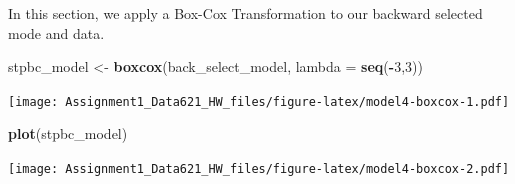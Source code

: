 \documentclass[
]{article}
\newenvironment{Shaded}{\begin{snugshade}}{\end{snugshade}}
\newcommand{\AttributeTok}[1]{\textcolor[rgb]{0.13,0.29,0.53}{#1}}
\newcommand{\DecValTok}[1]{\textcolor[rgb]{0.00,0.00,0.81}{#1}}
\newcommand{\FunctionTok}[1]{\textcolor[rgb]{0.13,0.29,0.53}{\textbf{#1}}}
\newcommand{\NormalTok}[1]{#1}
\newcommand{\OtherTok}[1]{\textcolor[rgb]{0.56,0.35,0.01}{#1}}
\newcommand{\SpecialCharTok}[1]{\textcolor[rgb]{0.81,0.36,0.00}{\textbf{#1}}}
\begin{document}
In this section, we apply a Box-Cox Transformation to our backward
selected mode and data.

\begin{Shaded}
\begin{Highlighting}[]
\NormalTok{stpbc\_model }\OtherTok{\textless{}{-}} \FunctionTok{boxcox}\NormalTok{(back\_select\_model, }\AttributeTok{lambda =} \FunctionTok{seq}\NormalTok{(}\SpecialCharTok{{-}}\DecValTok{3}\NormalTok{,}\DecValTok{3}\NormalTok{))}
\end{Highlighting}
\end{Shaded}

\texttt{[image: Assignment1\_Data621\_HW\_files/figure-latex/model4-boxcox-1.pdf]}

\begin{Shaded}
\begin{Highlighting}[]
\FunctionTok{plot}\NormalTok{(stpbc\_model)}
\end{Highlighting}
\end{Shaded}

\texttt{[image: Assignment1\_Data621\_HW\_files/figure-latex/model4-boxcox-2.pdf]}

\begin{Shaded}
\end{Shaded}
\end{document}
